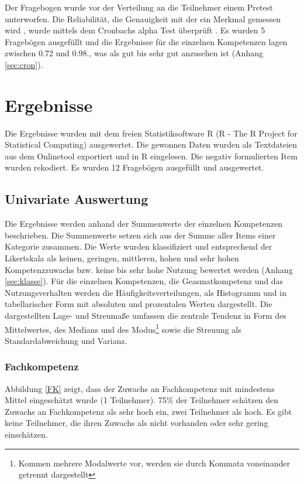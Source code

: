 \documentclass[12pt,smallheadings, bibliography=totoc]{scrartcl}
\begin{document}
Der Fragebogen wurde vor der Verteilung an die Teilnehmer einem Pretest
unterworfen. Die Reliabilität, die Genauigkeit mit der ein Merkmal
gemessen wird \parencite[5]{rammstedt2004bestimmung}, wurde mittels dem
Cronbachs alpha Test überprüft \parencite{Wassa}. Es wurden 5 Fragebögen
ausgefüllt und die Ergebnisse für die einzelnen Kompetenzen lagen
zwischen 0.72 und 0.98., was als gut bis sehr gut anzusehen ist (Anhang
\ref{sec:cron}).

\section{Ergebnisse}\label{ergebnisse}

Die Ergebnisse wurden mit dem freien Statistiksoftware R (R - The R
Project for Statistical Computing) ausgewertet. Die gewonnen Daten
wurden als Textdateien aus dem Onlinetool exportiert und in R
eingelesen. Die negativ formulierten Item wurden rekodiert. Es wurden 12
Fragebögen ausgefüllt und ausgewertet.

\subsection{Univariate Auswertung}\label{univariate-auswertung}

Die Ergebnisse werden anhand der Summenwerte der einzelnen Kompetenzen
beschrieben. Die Summenwerte setzen sich aus der Summe aller Items einer
Kategorie zusammen. Die Werte wurden klassifiziert und entsprechend der
Likertskala als keinen, geringen, mittleren, hohen und sehr hohen
Kompetenzzuwachs bzw. keine bis sehr hohe Nutzung bewertet werden
(Anhang \ref{sec:klasse}). Für die einzelnen Kompetenzen, die
Geasmatkompetenz und das Nutzungsverhalten werden die
Häufigkeitsverteilungen, als Histogramm und in tabellarischer Form mit
absoluten und prozentalen Werten dargestellt. Die dargestellten Lage-
und Streumaße umfassen die zentrale Tendenz in Form des Mittelwertes,
des Medians und des
Modus\footnote{Kommen mehrere Modalwerte vor, werden sie durch Kommata voneinander getrennt dargestellt}
sowie die Streuung als Standardabweichung und Varianz.

\subsubsection{Fachkompetenz}\label{fachkompetenz}

Abbildung \ref{FK} zeigt, dass der Zuwachs an Fachkompetenz mit
mindestens Mittel eingeschätzt wurde (1 Teilnehmer). 75\% der Teilnehmer
schätzen den Zuwachs an Fachkompetenz als sehr hoch ein, zwei Teilnehmer
als hoch. Es gibt keine Teilnehmer, die ihren Zuwachs als nicht
vorhanden oder sehr gering einschätzen.
\end{document}
